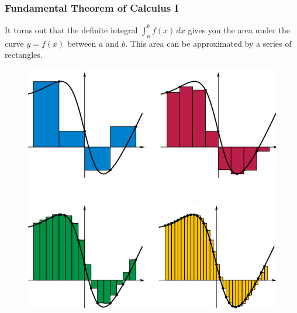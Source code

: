 \documentclass[xcolor=dvipsnames]{beamer}
\begin{document}
\begin{frame}
  \frametitle{Fundamental Theorem of Calculus I}
  It turns out that the definite integral $\int_{a}^{b}f(x)\,dx$ gives
  you the area under the curve $y=f(x)$ between $a$ and $b$. This area
  can be approximated by a series of rectangles.
\begin{figure}[h]
\includegraphics[scale=.3]{./ftoc-02.png}
\end{figure}
\end{frame}
\end{document}
